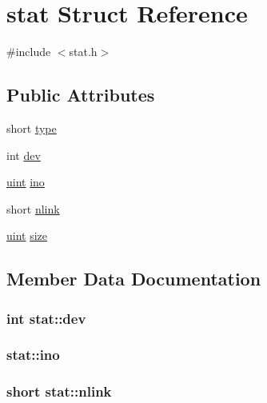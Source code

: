 \hypertarget{structstat}{}\section{stat Struct Reference}
\label{structstat}


{\ttfamily \#include $<$stat.\+h$>$}

\subsection*{Public Attributes}
\begin{DoxyCompactItemize}
\item 
short \hyperlink{structstat_a01f1b4cd7627d192a7875c9a188e0699}{type}
\item 
int \hyperlink{structstat_a14ef4f85e6fb86bf296360361d0f393b}{dev}
\item 
\hyperlink{custom__types_8h_a91ad9478d81a7aaf2593e8d9c3d06a14}{uint} \hyperlink{structstat_abf15624517ed5d79d0fa2a5553a68e25}{ino}
\item 
short \hyperlink{structstat_a99ca3487fd2f4799337eb4281f8871e4}{nlink}
\item 
\hyperlink{custom__types_8h_a91ad9478d81a7aaf2593e8d9c3d06a14}{uint} \hyperlink{structstat_a4ac15b64dd4d787c59a8a687d79adb35}{size}
\end{DoxyCompactItemize}


\subsection{Member Data Documentation}
\subsubsection[{\texorpdfstring{dev}{dev}}]{\setlength{\rightskip}{0pt plus 5cm}int stat\+::dev}\hypertarget{structstat_a14ef4f85e6fb86bf296360361d0f393b}{}\label{structstat_a14ef4f85e6fb86bf296360361d0f393b}
\subsubsection[{\texorpdfstring{ino}{ino}}]{ stat\+::ino}\hypertarget{structstat_abf15624517ed5d79d0fa2a5553a68e25}{}\label{structstat_abf15624517ed5d79d0fa2a5553a68e25}
\subsubsection[{\texorpdfstring{nlink}{nlink}}]{\setlength{\rightskip}{0pt plus 5cm}short stat\+::nlink}\hypertarget{structstat_a99ca3487fd2f4799337eb4281f8871e4}{}\label{structstat_a99ca3487fd2f4799337eb4281f8871e4}
